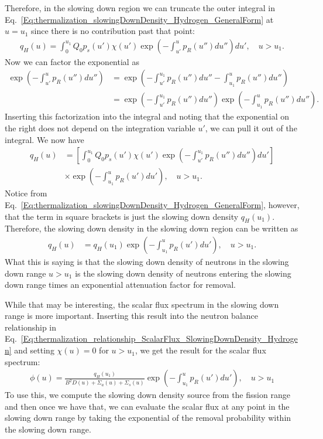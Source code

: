 Therefore, in the slowing down region we can truncate the outer integral in Eq.~\eqref{Eq:thermalization_slowingDownDensity_Hydrogen_GeneralForm} at $u = u_1$ since there is no contribution past that point:
\begin{align}
  q_H(u) = \int_0^{u_1} Q_0 p_s(u') \chi(u') \exp\left( -\int_{u'}^u p_R(u'') du'' \right) du' , \quad u > u_1.
\end{align}
Now we can factor the exponential as
\begin{align}
   \exp\left( -\int_{u'}^u p_R(u'') du'' \right) 
   &= \exp\left( -\int_{u'}^{u_1} p_R(u'') du'' -\int_{u_1}^u p_R(u'') du''  \right) \nonumber \\
   &= \exp\left( -\int_{u'}^{u_1} p_R(u'') du'' \right) \exp\left( -\int_{u_1}^u p_R(u'') du''  \right) .\nonumber
\end{align}
Inserting this factorization into the integral and noting that the exponential on the right does not depend on the integration variable $u'$, we can pull it out of the integral. We now have
\begin{align}
  q_H(u) &= \left[ \int_0^{u_1} Q_0 p_s(u') \chi(u') \exp\left( -\int_{u'}^{u_1} p_R(u'') du'' \right) du' \right] \nonumber \\
  &\times \exp\left( -\int_{u_1}^u p_R(u') du'  \right) , \quad u > u_1.
\end{align}
Notice from Eq.~\eqref{Eq:thermalization_slowingDownDensity_Hydrogen_GeneralForm}, however, that the term in square brackets is just the slowing down density $q_H(u_1)$. Therefore, the slowing down density in the slowing down region can be written as
\begin{align}
  q_H(u) &= q_H(u_1) \exp\left( -\int_{u_1}^u p_R(u') du'  \right) , \quad u > u_1. \label{Eq:thermalization_slowingDownDensity_Hydrogen_SlowingDownRange}
\end{align}
What this is saying is that the slowing down density of neutrons in the slowing down range $u > u_1$ is the slowing down density of neutrons entering the slowing down range times an exponential attenuation factor for removal.

While that may be interesting, the scalar flux spectrum in the slowing down range is more important. Inserting this result into the neutron balance relationship in Eq.~\eqref{Eq:thermalization_relationship_ScalarFlux_SlowingDownDensity_Hydrogen} and setting $\chi(u) = 0$ for $u > u_1$, we get the result for the scalar flux spectrum:
\begin{align}
  \phi(u) = \frac{ q_H(u_1) }{ B^2 D(u) + \Sigma_a(u) + \Sigma_s(u) } \exp\left( -\int_{u_1}^u p_R(u') du'  \right) , \quad u > u_1
\end{align}
To use this, we compute the slowing down density source from the fission range and then once we have that, we can evaluate the scalar flux at any point in the slowing down range by taking the exponential of the removal probability within the slowing down range.

